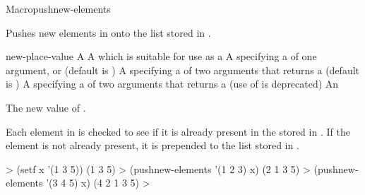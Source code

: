\documentclass[10pt,twoside,english,pdftex]{article}
\begin{document}

\begin{functiondoc}{Macro}{pushnew-elements}{
    }
%
%
  
\fnsyntax

\fnpurpose Pushes new elements in  onto the list stored in
. 

\fnpackage {}

\fnmodule {}

\fnargs
\begin{args}{new-place-value}
\arg[list] A 
\arg[place] A  which is suitable for use as a
\arg[key] A  specifying a 
of one argument, or \nil{} (default is \nil)
\arg[test] A  specifying a 
of two arguments that returns a  (default is
)
 A  specifying a
 of two arguments that returns a
 (use of  is deprecated)
 An 
\end{args}

\fnreturns The new value of . 

\fndescription Each element in  is checked to see if it is
already present in the  stored in . If
the element is not already present, it is prepended to the list stored
in .

\fnexamples
%
\W\supp
\begin{example}
  > (setf x '(1 3 5))
  (1 3 5)
  > (pushnew-elements '(1 2 3) x)
  (2 1 3 5)
  > (pushnew-elements '(3 4 5) x)
  (4 2 1 3 5)
  >
\end{example}

\end{functiondoc}

\end{document}
